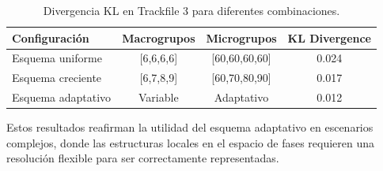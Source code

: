 \begin{table}[H]
    \centering
    \caption{Divergencia KL en Trackfile 3 para diferentes combinaciones.}
    \begin{tabular}{lccc}
        \toprule
        \textbf{Configuración} & \textbf{Macrogrupos} & \textbf{Microgrupos} & \textbf{KL Divergence} \\
        \midrule
        Esquema uniforme & [6,6,6,6] & [60,60,60,60] & 0.024 \\
        Esquema creciente & [6,7,8,9] & [60,70,80,90] & 0.017 \\
        Esquema adaptativo & Variable & Adaptativo & 0.012 \\
        \bottomrule
    \end{tabular}
    \label{tab:trackfile3_kl}
\end{table}

Estos resultados reafirman la utilidad del esquema adaptativo en escenarios complejos, donde las estructuras locales en el espacio de fases requieren una resolución flexible para ser correctamente representadas.


